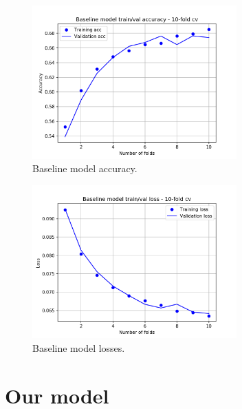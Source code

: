 \begin{figure}
	\centering
	\includegraphics[width=0.7\textwidth]{./TeX_files/img/baselinemodelacc.png}
	\caption{Baseline model accuracy.}
	\label{fig:baselinemodelacc}
\end{figure}
\begin{figure}
	\centering
	\includegraphics[width=0.7\textwidth]{./TeX_files/img/baselinemodelloss.png}
	\caption{Baseline model losses.}
	\label{fig:baselinemodelloss}
\end{figure}
\section{Our model}